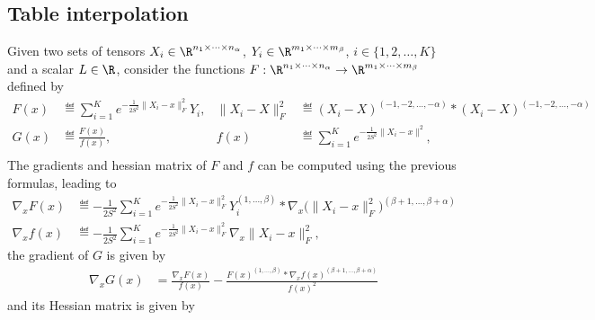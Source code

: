 \documentclass[11pt]{article}
\theoremstyle{remark}
\begin{document}
\subsection{Table interpolation}

Given two sets of tensors $X_i\in\R^{n_1\times\cdots\times n_\alpha}$, $Y_i\in\R^{m_1\times\cdots\times m_\beta}$, $i\in\{1,2,\dots,K\}$ and a
scalar $L\in\R$, consider the functions $F:\R^{n_1\times\cdots\times n_\alpha}\to\R^{m_1\times\cdots\times m_\beta}$
defined by
\begin{align*}
  F(x)&\eqdef \sum_{i=1}^K e^{-\frac{1}{2S^2}\|X_i-x\|_F^2} Y_i , &
  \|X_i-X\|_F^2&\eqdef (X_i-X)^{(-1,-2,\dots,-\alpha)} * (X_i-X)^{(-1,-2,\dots,-\alpha)}\\
  G(x)&\eqdef \frac{F(x)}{f(x)}, &
  f(x)&\eqdef \sum_{i=1}^K e^{-\frac{1}{2S^2}\|X_i-x\|^2}, \\
\end{align*}
The gradients and hessian matrix of $F$ and $f$ can be computed using the previous
formulas, leading to
\begin{align*}
  \nabla_x F(x)&\eqdef-\frac{1}{2S^2}\sum_{i=1}^K e^{-\frac{1}{2S^2}\|X_i-x\|_F^2}
            Y_i^{(1,\dots,\beta)} * \nabla_x \big(  \|X_i-x\|_F^2 \big)^{(\beta+1,\dots,\beta+\alpha)}\\
  \nabla_x f(x)&\eqdef-\frac{1}{2S^2}\sum_{i=1}^K e^{-\frac{1}{2S^2}\|X_i-x\|_F^2} \nabla_x
            \|X_i-x\|_F^2,
\end{align*}
the gradient of $G$ is given by
\begin{align*}
  \nabla_x G(x)&=\frac{\nabla_x F(x)}{f(x)}-\frac{F(x)^{(1,\dots,\beta)}*\nabla_x f(x)^{(\beta+1,\dots,\beta+\alpha)}}{f(x)^2}
\end{align*}
and its Hessian matrix is given by
\end{document}
